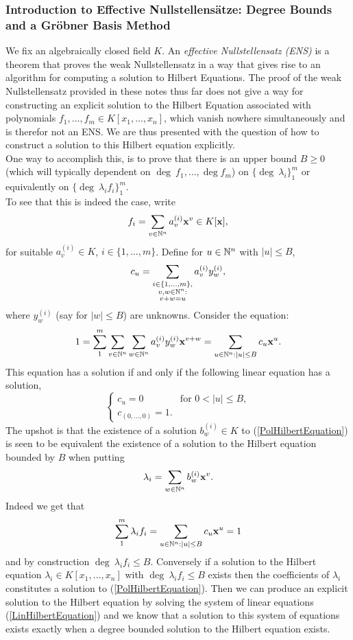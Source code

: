 \subsubsection{Introduction to Effective Nullstellensätze: Degree Bounds and a Gröbner Basis Method}
We fix an algebraically closed field $K$.
An \textit{effective Nullstellensatz (ENS)} is a theorem that proves the weak Nullstellensatz in a way that gives rise to an algorithm for computing a solution to Hilbert Equations. 
The proof of the weak Nullstellensatz provided in these notes thus far does not give a way for constructing an explicit solution to the Hilbert Equation associated with polynomials $f_1,\dots,f_m\in K[x_1,\dots,x_n]$, which vanish nowhere simultaneously and is therefor not an ENS.
We are thus presented with the question of how to construct a solution to this Hilbert equation explicitly.\\
One way to accomplish this, is to prove that there is an upper bound $B\geq 0$ (which will typically dependent on $\deg \ f_1,\dots,\deg f_m$) on $\{\deg\ \lambda_i\}_1^m$ or equivalently on $\{\deg\ \lambda_if_i\}_1^m$.\\ 
To see that this is indeed the case, write 
$$f_i = \sum_{v\in \mathbb{N}^n} a_v^{(i)} \mathbf{x}^v \in K[\mathbf{x}],$$
for suitable $a_v^{(i)}\in K$, $i\in\{1,\dots,m\}$. Define for $u\in \mathbb{N}^n$ with $\vert u\vert \leq B$,  
$$c_u  =\sum_{\substack{i\in\{1,\dots,m\},\\ v,w\in \mathbb{N}^n :\\ v+w=u}} a_v^{(i)}y_w^{(i)},$$
where $y_w^{(i)}$ (say for $\vert w\vert \leq B$) are unknowns. 
Consider the equation: 
\begin{equation}\label{PolHilbertEquation}
    1 = \sum_1^m \sum_{v\in \mathbb{N}^n} \sum_{w\in \mathbb{N}^n} a_v^{(i)}y_w^{(i)} \mathbf{x}^{v+w} = \sum_{u\in \mathbb{N}^n : \vert u\vert \leq B} c_u \mathbf{x}^u.
\end{equation}
This equation has a solution if and only if the following linear equation has a solution,
\begin{equation}\label{LinHilbertEquation}
\begin{cases}
    c_u = 0 & \text{for } 0<\vert u\vert \leq B,\\
    c_{(0,\dots,0)} = 1.
\end{cases}
\end{equation}
The upshot is that the existence of a  solution  $b_w^{(i)}\in K$ to (\ref{PolHilbertEquation}) is seen to be equivalent the existence of a solution to the Hilbert equation bounded by $B$ when putting 
$$\lambda_i = \sum_{w\in \mathbb{N}^n} b_w^{(i)}\mathbf{x}^v.$$
Indeed we get that 
$$\sum_1^m \lambda_i f_i = \sum_{u\in \mathbb{N}^n : \vert u\vert \leq B} c_u \mathbf{x}^u = 1$$
and by construction $\deg \ \lambda_i f_i \leq B.$ Conversely if a solution to the Hilbert equation $\lambda_i\in K[x_1,\dots,x_n]$ with $\deg \ \lambda_i f_i \leq B$ exists then the coefficients of $\lambda_i$ constitutes a solution to (\ref{PolHilbertEquation}). Then we can produce an explicit solution to the Hilbert equation by solving the system of linear equations (\ref{LinHilbertEquation}) and we know that a solution to this system of equations exists exactly when a degree bounded solution to the Hilbert equation exists.\\

